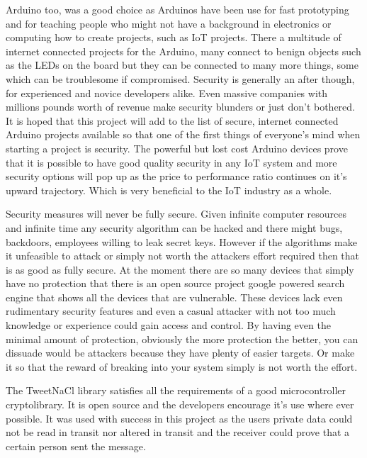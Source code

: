 Arduino too, was a good choice as Arduinos have been use for fast prototyping and for teaching people who might not have a background in electronics or computing how to create projects, such as IoT projects. There a multitude of internet connected projects for the Arduino, many connect to benign objects such as the LEDs on the board but they can be connected to many more things, some which can be troublesome if compromised. Security is generally an after though, for experienced and novice developers alike. Even massive companies with millions pounds worth of revenue make security blunders or just don't bothered. It is hoped that this project will add to the list of secure, internet connected Arduino projects available so that one of the first things of everyone's mind when starting a project is security. The powerful but lost cost Arduino devices prove that it is possible to have good quality security in any IoT system and more security options will pop up as the price to performance ratio continues on it's upward trajectory. Which is very beneficial to the IoT industry as a whole.

Security measures will never be fully secure. Given infinite computer resources and infinite time any security algorithm can be hacked and there might bugs, backdoors, employees willing to leak secret keys. However if the algorithms make it unfeasible to attack or simply not worth the attackers effort required then that is as good as fully secure. At the moment there are so many devices that simply have no protection that there is an open source project google powered search engine that shows all the devices that are vulnerable. These devices lack even rudimentary security features and even a casual attacker with not too much knowledge or experience could gain access and control. By having even the minimal amount of protection, obviously the more protection the better, you can dissuade would be attackers because they have plenty of easier targets. Or make it so that the reward of breaking into your system simply is not worth the effort.

The TweetNaCl library satisfies all the requirements of a good microcontroller cryptolibrary. It is open source and the developers encourage it's use where ever possible. It was used with success in this project as the users private data could not be read in transit nor altered in transit and the receiver could prove that a certain person sent the message. 

